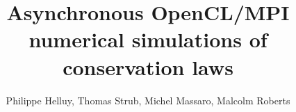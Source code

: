 \documentclass{svmult}
\begin{document}
%

\title*{Asynchronous OpenCL/MPI numerical simulations of conservation laws}
%
%
%
%
%
\author{Philippe Helluy, Thomas Strub, Michel Massaro, Malcolm Roberts}
\end{document}
